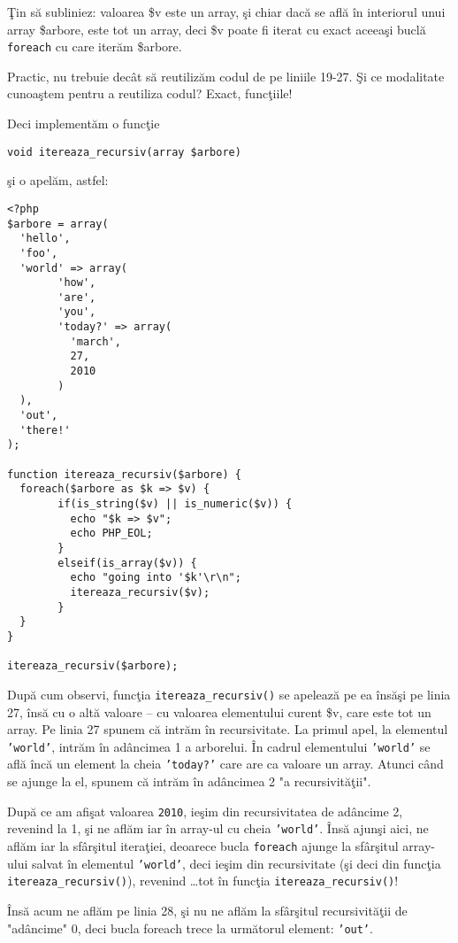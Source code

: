 Ţin să subliniez: valoarea \$v este un array, şi chiar
dacă se află în interiorul unui array \$arbore, este tot un
array, deci \$v poate fi iterat cu exact aceeaşi buclă
\texttt{foreach}
cu care iterăm \$arbore.

Practic, nu trebuie decât să reutilizăm codul de pe liniile
19-27. Şi ce modalitate cunoaştem pentru a reutiliza codul?
Exact, funcţiile!

Deci implementăm o funcţie
\begin{verbatim}
void itereaza_recursiv(array $arbore)
\end{verbatim}
şi o apelăm, astfel:
\begin{lstlisting}
<?php
$arbore = array(
  'hello',
  'foo',
  'world' => array(
        'how',
        'are',
        'you',
        'today?' => array(
          'march',
          27,
          2010
        )
  ),
  'out',
  'there!'
);

function itereaza_recursiv($arbore) {
  foreach($arbore as $k => $v) {
        if(is_string($v) || is_numeric($v)) {
          echo "$k => $v";
          echo PHP_EOL;
        }
        elseif(is_array($v)) {
          echo "going into '$k'\r\n";
          itereaza_recursiv($v);
        }
  }
}

itereaza_recursiv($arbore);
\end{lstlisting}
După cum observi, funcţia \texttt{itereaza\_recursiv()} se apelează
pe ea însăşi pe linia 27, însă cu o altă valoare -- cu
valoarea elementului curent \$v, care este tot un array.
Pe linia 27 spunem că intrăm în recursivitate. La primul apel,
la elementul \texttt{'world'}, intrăm în adâncimea 1
a arborelui. În cadrul elementului \texttt{'world'}
se află încă un element la cheia \texttt{'today?'}
care are ca valoare un array. Atunci când se ajunge la el,
spunem că intrăm în adâncimea 2 "a recursivităţii".

După ce am afişat valoarea \texttt{2010}, ieşim din recursivitatea
de adâncime 2, revenind la 1, şi ne aflăm iar în array-ul cu
cheia \texttt{'world'}. Însă ajunşi aici, ne aflăm iar
la sfârşitul iteraţiei, deoarece bucla \texttt{foreach}
ajunge la sfârşitul array-ului salvat în elementul \texttt{'world'},
deci ieşim din recursivitate (şi deci din funcţia \texttt{itereaza\_recursiv()}),
revenind \ldots tot în funcţia \texttt{itereaza\_recursiv()}!

Însă acum ne aflăm pe linia 28, şi nu ne aflăm la sfârşitul recursivităţii
de "adâncime" 0, deci bucla foreach trece la următorul element: \texttt{'out'}.



